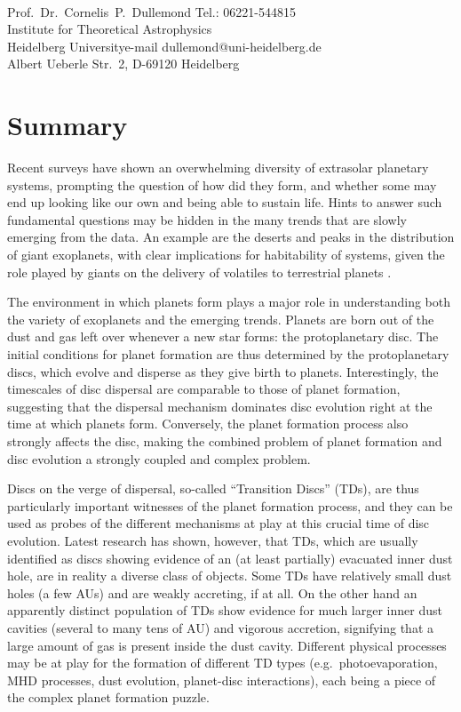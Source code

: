 \documentclass[10pt,fleqn,twoside]{article}
\begin{document}
\\
Prof.~Dr.~Cornelis~P.~Dullemond \hfill Tel.: 06221-544815\\
Institute for Theoretical Astrophysics\\
 Heidelberg University\hfill e-mail dullemond@uni-heidelberg.de\\
Albert Ueberle Str.\ 2, D-69120 Heidelberg\\


\pagebreak[4]

\fontsize{11}{12}\selectfont

\section{Summary}

Recent surveys have shown an overwhelming diversity of extrasolar
planetary systems, prompting the question of how did they form,
and whether some may end up
looking like our own and being able to sustain life. Hints to answer
such fundamental questions may be hidden in the many trends that are
slowly emerging from the data. An example are the deserts and peaks in the distribution of
giant exoplanets, with clear implications for habitability of systems,
given the role played by giants on the delivery of volatiles to
terrestrial planets \citep[e.g.,][]{2014ApJ...786...33Q}. 

The environment
in which planets form plays a major role in understanding both the
variety of exoplanets and the emerging trends. Planets are
born out of the dust and gas left over whenever a new star forms: the
protoplanetary disc. The initial conditions for planet formation
are thus determined by the protoplanetary discs, which evolve and disperse as they
give birth to planets. Interestingly, the timescales of disc dispersal
are comparable to those of planet formation, suggesting that the
dispersal mechanism dominates disc evolution right at the time at
which planets form.  Conversely, the planet formation process also
strongly affects the disc, making the combined problem of planet formation
and disc evolution a strongly coupled and complex problem. 

Discs on the verge of dispersal, so-called ``Transition Discs'' (TDs),  are thus particularly important
witnesses of the planet formation process, and they can be used
as probes of the different mechanisms at play at this crucial time of
disc evolution. Latest research has shown, however, that TDs, which are usually
identified as discs showing evidence of an (at least partially)
evacuated inner dust hole, are in reality a diverse class of
objects. Some TDs have relatively small dust holes (a few AUs) and are
weakly accreting, if at all. On the other hand an apparently distinct
population of TDs show evidence for much larger inner dust cavities
(several to many tens of AU) and vigorous accretion, signifying that a
large amount of gas is present inside the dust cavity. Different
physical processes may be at play for the formation of different TD
types (e.g.\ photoevaporation, MHD processes, dust evolution, planet-disc interactions),
each being a piece of the complex planet formation puzzle. 
\end{document}
